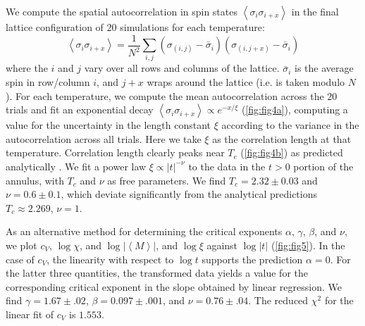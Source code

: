 \documentclass[letter,scriptaddress,twocolumn, prl,nofootinbib]{revtex4}
\newcommand{\submin}[1]{\left\langle #1 \right\rangle}
\begin{document}
We compute the spatial autocorrelation in spin states $\submin{\sigma_i\sigma_{i + x}}$ in the final lattice configuration of $20$ simulations for each temperature:
\begin{equation}
	\label{autocor}
	\submin{\sigma_i\sigma_{i + x}} = \frac{1}{N^2}\sum_{i, j} (\sigma_{(i, j)} - \bar{\sigma}_i)(\sigma_{(i, j + x)} - \bar{\sigma}_i)
\end{equation}
where the $i$ and $j$ vary over all rows and columns of the lattice. $\bar{\sigma}_i$ is the average spin in row/column $i$, and $j + x$ wraps around the lattice (i.e. is taken modulo $N$). For each temperature, we compute the mean autocorrelation across the $20$ trials and fit an exponential decay $\submin{\sigma_i\sigma_{i + x}} \propto e^{-x/\xi}$ (\autoref{fig:fig4a}), computing a value for the uncertainty in the length constant $\xi$ according to the variance in the autocorrelation across all trials. Here we take $\xi$ as the correlation length at that temperature. Correlation length clearly peaks near $T_c$ (\autoref{fig:fig4b}) as predicted analytically \cite{Onsager}. We fit a power law $\xi \propto |t|^{-\nu}$ to the data in the $t > 0$ portion of the annulus, with $T_c$ and $\nu$ as free parameters. We find $T_c = 2.32 \pm 0.03$ and $\nu = 0.6 \pm 0.1$, which deviate significantly from the analytical predictions $T_c \approx 2.269$, $\nu = 1$.

As an alternative method for determining the critical exponents $\alpha$, $\gamma$, $\beta$, and $\nu$, we plot $c_V$, $\log \chi$, and $\log |\submin{M}|$, and $\log \xi$ against $\log |t|$ (\autoref{fig:fig5}). In the case of $c_V$, the linearity with respect to $\log t$ supports the prediction $\alpha = 0$. For the latter three quantities, the transformed data yields a value for the corresponding critical exponent in the slope obtained by linear regression. We find $\gamma = 1.67 \pm .02$, $\beta = 0.097 \pm .001$, and $\nu = 0.76 \pm .04$. The reduced $\chi^2$ for the linear fit of $c_V$ is $1.553$.
\end{document}
